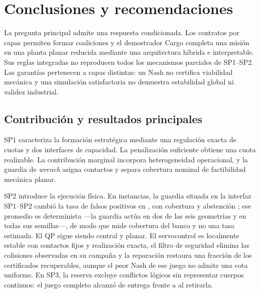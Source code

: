 \section{Conclusiones y recomendaciones}
\label{sec:conclusions}

La pregunta principal admite una respuesta condicionada. Los contratos por
capas permiten formar coaliciones y el demostrador Cargo completa una misión en
una planta planar reducida mediante una arquitectura híbrida e interpretable.
Sus reglas integradas no reproducen todos los mecanismos parciales de SP1--SP2. Las
garantías pertenecen a capas distintas: un Nash no certifica viabilidad mecánica
y una simulación satisfactoria no demuestra estabilidad global ni validez
industrial.

\subsection{Contribución y resultados principales}

SP1 caracteriza la formación estratégica mediante una regulación exacta de
cuotas y dos interfaces de capacidad. La penalización suficiente obtiene una
cuota realizable. La contribución marginal incorpora heterogeneidad operacional, y la guardia de \emph{wrench}
asigna contactos y separa cobertura nominal de factibilidad mecánica planar.

SP2 introduce la ejecución física. En \SPThreeWorlds{} instancias, la guardia
situada en la interfaz SP1--SP2 cambió la tasa de falsos positivos en
\SPThreeGuardEffect{}, con cobertura \SPThreeGuardedCoverage{} y abstención
\SPThreeGuardedAbstention{}; ese promedio es determinista ---la guardia actúa
en dos de las seis geometrías y en todas sus semillas---, de modo que mide
cobertura del banco y no una tasa estimada. El QP sigue siendo central y planar. El
servocontrol es localmente estable con contactos fijos y realización exacta,
el filtro de seguridad elimina las colisiones observadas en su campaña y la
reparación restaura una fracción \SPSixConditionalRestore{} de los certificados
recuperables, aunque el peor Nash de ese juego no admite una cota uniforme. En SP3, la reserva excluye conflictos lógicos sin representar
cuerpos continuos: el juego completo alcanzó \SPSevenProposedSuccess{} de
entrega frente a \SPSevenNoReservationSuccess{} al retirarla.

